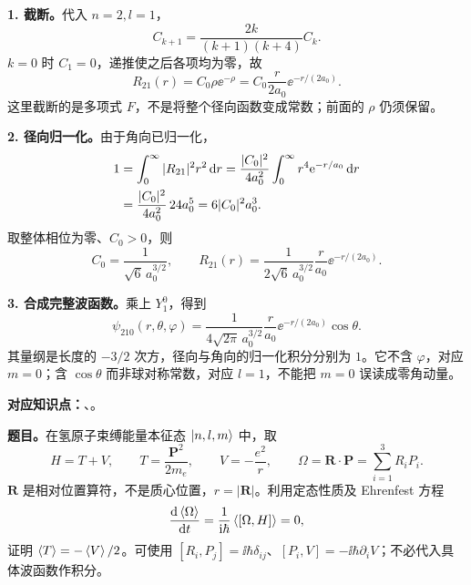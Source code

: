 \begin{checkedsolution}
\textbf{1. 截断。}代入 $n=2,l=1$，
\begin{equation}
  C_{k+1}=\frac{2k}{(k+1)(k+4)}C_k.
\end{equation}
$k=0$ 时 $C_1=0$，递推使之后各项均为零，故
\begin{equation}
  R_{21}(r)=C_0\rho\ee^{-\rho}
    =C_0\frac{r}{2a_0}\ee^{-r/(2a_0)}.
\end{equation}
这里截断的是多项式 $F$，不是将整个径向函数变成常数；前面的 $\rho$ 仍须保留。

\textbf{2. 径向归一化。}由于角向已归一化，
\begin{align}
  1&=\int_0^\infty|R_{21}|^2r^2\mathop{}\!\mathrm{d} r
    =\frac{|C_0|^2}{4a_0^2}\int_0^\infty r^4\mathrm{e}^{-r/a_0}\mathop{}\!\mathrm{d} r\notag\\
   &=\frac{|C_0|^2}{4a_0^2}\,24a_0^5
    =6|C_0|^2a_0^3.
\end{align}
取整体相位为零、$C_0>0$，则
\begin{equation}
  C_0=\frac1{\sqrt6\,a_0^{3/2}},\qquad
  \boxed{R_{21}(r)=\frac1{2\sqrt6\,a_0^{3/2}}
     \frac r{a_0}\ee^{-r/(2a_0)}.}
\end{equation}

\textbf{3. 合成完整波函数。}乘上 $Y_1^0$，得到
\begin{equation}
  \boxed{\psi_{210}(r,\theta,\varphi)
    =\frac1{4\sqrt{2\pi}\,a_0^{3/2}}
      \frac r{a_0}\ee^{-r/(2a_0)}\cos\theta.}
\end{equation}
其量纲是长度的 $-3/2$ 次方，径向与角向的归一化积分分别为 $1$。它不含 $\varphi$，对应 $m=0$；含 $\cos\theta$ 而非球对称常数，对应 $l=1$，不能把 $m=0$ 误读成零角动量。
\end{checkedsolution}

\textbf{对应知识点：}、。

\textbf{题目。}在氢原子束缚能量本征态 $\left|n,l,m\right\rangle$ 中，取
\begin{equation}
  H=T+V,\qquad T=\frac{\mathbf P^2}{2m_e},\qquad
  V=-\frac{e^2}{r},\qquad
  \Omega=\mathbf R\cdot\mathbf P=\sum_{i=1}^3R_iP_i.
\end{equation}
$\mathbf R$ 是相对位置算符，不是质心位置，$r=|\mathbf R|$。利用定态性质及 Ehrenfest 方程
\begin{equation}
  \frac{\mathop{}\!\mathrm{d}\left\langle \Omega \right\rangle}{\mathop{}\!\mathrm{d} t}
    =\frac1{\mathrm{i}\hbar}\left\langle [\Omega,H] \right\rangle=0,
\end{equation}
证明 $\left\langle T \right\rangle=-\left\langle V \right\rangle/2$。可使用 $[R_i,P_j]=\ii\hbar\delta_{ij}$、$[P_i,V]=-\ii\hbar\partial_iV$；不必代入具体波函数作积分。

